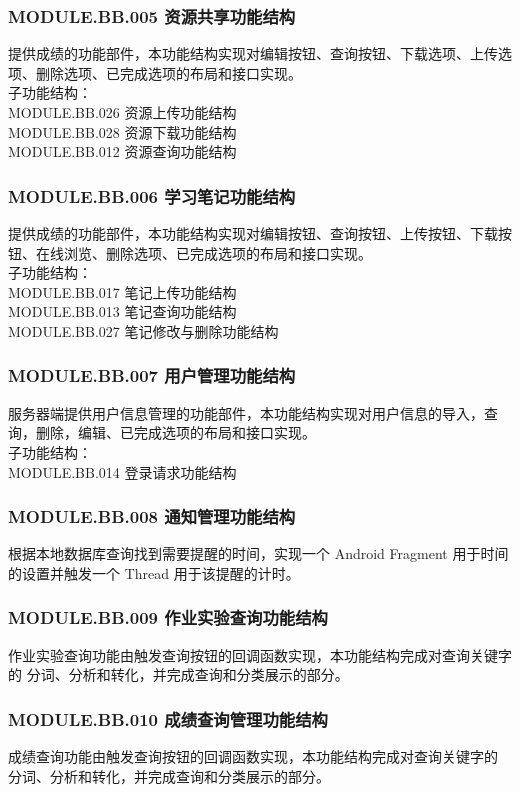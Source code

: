 \subsubsection{MODULE.BB.005    资源共享功能结构}
提供成绩的功能部件，本功能结构实现对编辑按钮、查询按钮、下载选项、上传选项、删除选项、已完成选项的布局和接口实现。
\\子功能结构：
\\MODULE.BB.026 资源上传功能结构
\\MODULE.BB.028 资源下载功能结构
\\MODULE.BB.012 资源查询功能结构

\subsubsection{MODULE.BB.006    学习笔记功能结构}
提供成绩的功能部件，本功能结构实现对编辑按钮、查询按钮、上传按钮、下载按钮、在线浏览、删除选项、已完成选项的布局和接口实现。
\\子功能结构：
\\MODULE.BB.017 笔记上传功能结构
\\MODULE.BB.013 笔记查询功能结构
\\MODULE.BB.027 笔记修改与删除功能结构 

\subsubsection{MODULE.BB.007    用户管理功能结构}
服务器端提供用户信息管理的功能部件，本功能结构实现对用户信息的导入，查询，删除，编辑、已完成选项的布局和接口实现。
\\子功能结构：
\\MODULE.BB.014 登录请求功能结构

\subsubsection{MODULE.BB.008    通知管理功能结构}
根据本地数据库查询找到需要提醒的时间，实现一个 Android Fragment 用于时间的设置并触发一个 Thread 用于该提醒的计时。

\subsubsection{MODULE.BB.009    作业实验查询功能结构}
作业实验查询功能由触发查询按钮的回调函数实现，本功能结构完成对查询关键字的 分词、分析和转化，并完成查询和分类展示的部分。

\subsubsection{MODULE.BB.010    成绩查询管理功能结构}
成绩查询功能由触发查询按钮的回调函数实现，本功能结构完成对查询关键字的 分词、分析和转化，并完成查询和分类展示的部分。

